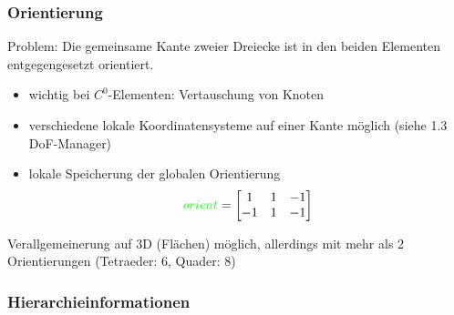 \subsubsection{Orientierung}
Problem: Die gemeinsame Kante zweier Dreiecke ist in den beiden Elementen entgegengesetzt orientiert.
\begin{itemize}
\item  wichtig bei $C^0$-Elementen: Vertauschung von Knoten
\item verschiedene lokale Koordinatensysteme auf einer Kante möglich (siehe 1.3 DoF-Manager)
\item lokale Speicherung der globalen Orientierung
  \begin{align*}
    {\color{green} orient} = 
    \begin{bmatrix}
      1 & 1 & -1\\
      -1 & 1 &-1 \\
    \end{bmatrix}
  \end{align*}
\end{itemize}
  \begin{bemerkung*}
    Verallgemeinerung auf 3D (Flächen) möglich, allerdings mit mehr als 2 Orientierungen (Tetraeder: 6, Quader: 8)
  \end{bemerkung*}
\subsubsection{Hierarchieinformationen}

